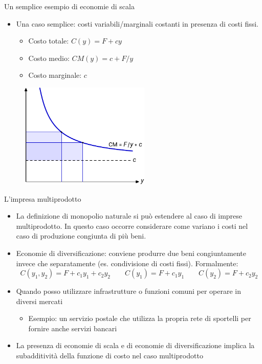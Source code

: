 \documentclass[aspectratio=64,11pt]{beamer}
\begin{document}
\begin{frame}{Un semplice esempio di economie di scala}
\begin{itemize}
\item Una caso semplice: costi variabili/marginali costanti in presenza di costi fissi.
\begin{itemize}
\item Costo totale: $C(y)=F+cy$
\item Costo medio: $CM(y)=c+F/y$
\item Costo marginale: $c$
\end{itemize}
\end{itemize}
\begin{figure}[htbp]
\centering
\includegraphics[height=5cm]{./figure/monopolio-naturale-1-color.pdf}
\end{figure}
\end{frame}


\begin{frame}{L'impresa multiprodotto}
\begin{itemize}
\item La definizione di monopolio naturale si può estendere al caso di imprese
multiprodotto. In questo caso occorre considerare come variano i costi nel
caso di produzione congiunta di più beni.
\item \alert{Economie di diversificazione}: conviene produrre due beni congiuntamente
invece che separatamente (es. condivisione di costi fissi). Formalmente:
\begin{equation*}
 C(y_1,y_2)=F + c_1y_1+c_2y_2 \qquad C(y_1)=F + c_1y_1 \qquad  C(y_2)=F + c_2y_2 
\end{equation*}
\item Quando posso utilizzare infrastrutture o funzioni comuni per operare in diversi mercati
\begin{itemize}
\item Esempio: un servizio postale che utilizza la propria rete di sportelli per
fornire anche servizi bancari
\end{itemize}
\item La presenza di economie di scala e di economie di diversificazione implica
la subadditività della funzione di costo nel caso multiprodotto
\end{itemize}
\end{frame}
\end{document}
